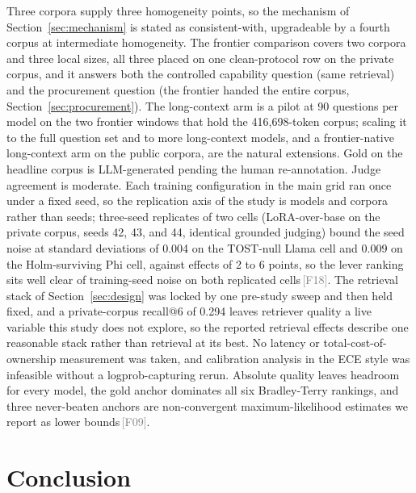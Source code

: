 \documentclass[11pt]{article}
\newcommand{\rcpt}[1]{\textcolor{gray}{\,\textsf{\scriptsize[#1]}}}
\begin{document}
Three corpora supply three homogeneity points, so the mechanism of Section~\ref{sec:mechanism} is stated as consistent-with, upgradeable by a fourth corpus at intermediate homogeneity. The frontier comparison covers two corpora and three local sizes, all three placed on one clean-protocol row on the private corpus, and it answers both the controlled capability question (same retrieval) and the procurement question (the frontier handed the entire corpus, Section~\ref{sec:procurement}). The long-context arm is a pilot at 90 questions per model on the two frontier windows that hold the 416,698-token corpus; scaling it to the full question set and to more long-context models, and a frontier-native long-context arm on the public corpora, are the natural extensions. Gold on the headline corpus is LLM-generated pending the human re-annotation. Judge agreement is moderate. Each training configuration in the main grid ran once under a fixed seed, so the replication axis of the study is models and corpora rather than seeds; three-seed replicates of two cells (LoRA-over-base on the private corpus, seeds 42, 43, and 44, identical grounded judging) bound the seed noise at standard deviations of 0.004 on the TOST-null Llama cell and 0.009 on the Holm-surviving Phi cell, against effects of 2 to 6 points, so the lever ranking sits well clear of training-seed noise on both replicated cells\rcpt{F18}. The retrieval stack of Section~\ref{sec:design} was locked by one pre-study sweep and then held fixed, and a private-corpus recall@6 of 0.294 leaves retriever quality a live variable this study does not explore, so the reported retrieval effects describe one reasonable stack rather than retrieval at its best. No latency or total-cost-of-ownership measurement was taken, and calibration analysis in the ECE style was infeasible without a logprob-capturing rerun. Absolute quality leaves headroom for every model, the gold anchor dominates all six Bradley-Terry rankings, and three never-beaten anchors are non-convergent maximum-likelihood estimates we report as lower bounds\rcpt{F09}.

\section{Conclusion}
\label{sec:conclusion}
\end{document}
